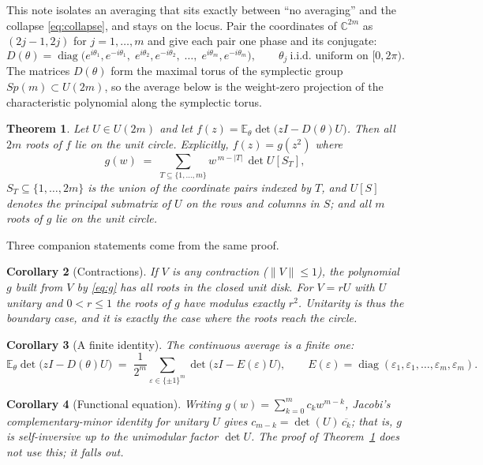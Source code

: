 \documentclass[11pt]{amsart}
\newtheorem{theorem}{Theorem}[section]
\newtheorem{corollary}[theorem]{Corollary}
\theoremstyle{definition}
\theoremstyle{remark}
\newcommand{\C}{\mathbb{C}}
\newcommand{\E}{\mathbb{E}}
\DeclareMathOperator{\diag}{diag}
\begin{document}
This note isolates an averaging that sits exactly between ``no averaging'' and the collapse \eqref{eq:collapse}, and stays on the locus. Pair the coordinates of $\C^{2m}$ as $(2j-1, 2j)$ for $j = 1, \ldots, m$ and give each pair one phase and its conjugate:
\[
D(\theta) = \diag\bigl(e^{i\theta_1}, e^{-i\theta_1},\; e^{i\theta_2}, e^{-i\theta_2},\; \ldots,\; e^{i\theta_m}, e^{-i\theta_m}\bigr),
\qquad \theta_j \ \text{i.i.d. uniform on } [0, 2\pi).
\]
The matrices $D(\theta)$ form the maximal torus of the symplectic group $Sp(m) \subset U(2m)$, so the average below is the weight-zero projection of the characteristic polynomial along the symplectic torus.

\begin{theorem}\label{thm:main}
Let $U \in U(2m)$ and let $f(z) = \E_\theta \det\bigl(zI - D(\theta)U\bigr)$. Then all $2m$ roots of $f$ lie on the unit circle. Explicitly, $f(z) = g(z^2)$ where
\begin{equation}\label{eq:g}
g(w) \;=\; \sum_{T \subseteq \{1, \ldots, m\}} w^{\,m - |T|}\, \det U[S_T],
\end{equation}
$S_T \subseteq \{1, \ldots, 2m\}$ is the union of the coordinate pairs indexed by $T$, and $U[S]$ denotes the principal submatrix of $U$ on the rows and columns in $S$; and all $m$ roots of $g$ lie on the unit circle.
\end{theorem}

Three companion statements come from the same proof.

\begin{corollary}[Contractions]\label{cor:contraction}
If $V$ is any contraction ($\|V\| \le 1$), the polynomial $g$ built from $V$ by \eqref{eq:g} has all roots in the closed unit disk. For $V = rU$ with $U$ unitary and $0 < r \le 1$ the roots of $g$ have modulus exactly $r^2$. Unitarity is thus the boundary case, and it is exactly the case where the roots reach the circle.
\end{corollary}

\begin{corollary}[A finite identity]\label{cor:finite}
The continuous average is a finite one:
\[
\E_\theta \det\bigl(zI - D(\theta)U\bigr) \;=\; \frac{1}{2^m} \sum_{\varepsilon \in \{\pm 1\}^m} \det\bigl(zI - E(\varepsilon)U\bigr),
\qquad E(\varepsilon) = \diag(\varepsilon_1, \varepsilon_1, \ldots, \varepsilon_m, \varepsilon_m).
\]
\end{corollary}

\begin{corollary}[Functional equation]\label{cor:selfinv}
Writing $g(w) = \sum_{k=0}^m c_k w^{m-k}$, Jacobi's complementary-minor identity for unitary $U$ gives $c_{m-k} = \det(U)\, \overline{c_k}$; that is, $g$ is self-inversive up to the unimodular factor $\det U$. The proof of Theorem~\ref{thm:main} does not use this; it falls out.
\end{corollary}
\end{document}
